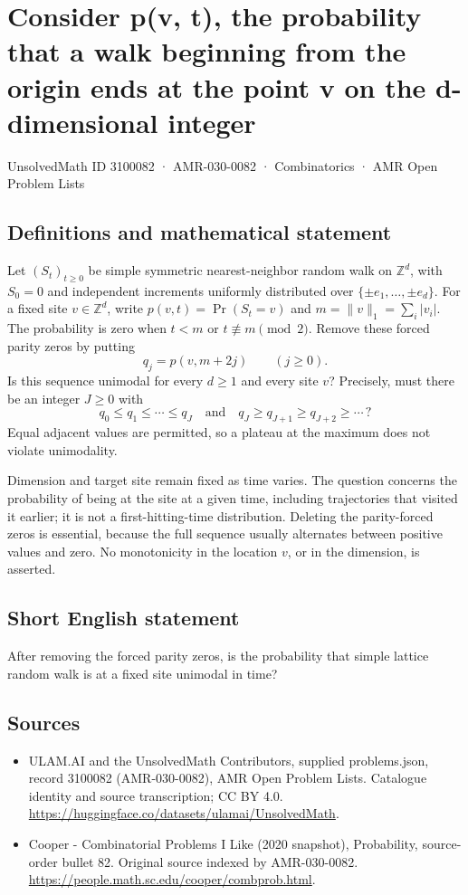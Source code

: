 \documentclass[11pt,a4paper]{article}
\begin{document}
\section*{Consider p(v, t), the probability that a walk beginning from the origin ends at the point v on the d-dimensional integer}\label{3100082}
{\small UnsolvedMath ID 3100082 · AMR-030-0082 · Combinatorics · AMR Open Problem Lists}
\subsection{Definitions and mathematical statement}
Let $(S_t)_{t\ge0}$ be simple symmetric nearest-neighbor random
walk on $\mathbb Z^d$, with $S_0=0$ and independent increments
uniformly distributed over $\{\pm e_1,\ldots,\pm e_d\}$.
For a fixed site $v\in\mathbb Z^d$, write
$p(v,t)=\Pr(S_t=v)$ and $m=\|v\|_1=\sum_i|v_i|$.
The probability is zero when $t<m$ or $t\not\equiv m\pmod2$.
Remove these forced parity zeros by putting
\[
                       q_j=p(v,m+2j)\qquad(j\ge0).
\]
Is this sequence unimodal for every $d\ge1$ and every site $v$?
Precisely, must there be an integer $J\ge0$ with
\[
 q_0\le q_1\le\cdots\le q_J
                  \quad\text{and}\quad
 q_J\ge q_{J+1}\ge q_{J+2}\ge\cdots\,?
\]
Equal adjacent values are permitted, so a plateau at the maximum
does not violate unimodality.

Dimension and target site remain fixed as time varies. The
question concerns the probability of being at the site at a
given time, including trajectories that visited it earlier;
it is not a first-hitting-time distribution. Deleting the
parity-forced zeros is essential, because the full sequence
usually alternates between positive values and zero. No
monotonicity in the location $v$, or in the dimension, is asserted.
\subsection{Short English statement}
After removing the forced parity zeros, is the probability that simple lattice random walk is at a fixed site unimodal in time?
\subsection{Sources}
\begin{itemize}
\item[S1] ULAM.AI and the UnsolvedMath Contributors, supplied problems.json, record 3100082 (AMR-030-0082), AMR Open Problem Lists. Catalogue identity and source transcription; CC BY 4.0.
\url{https://huggingface.co/datasets/ulamai/UnsolvedMath}.
\item[S2] Cooper - Combinatorial Problems I Like (2020 snapshot), Probability, source-order bullet 82. Original source indexed by AMR-030-0082.
\url{https://people.math.sc.edu/cooper/combprob.html}.
\end{itemize}
\end{document}
